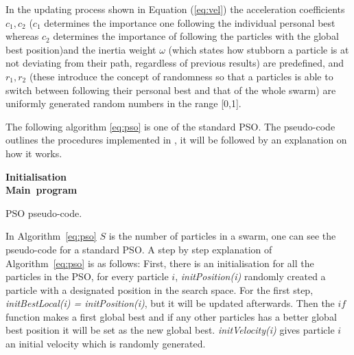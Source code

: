 \documentclass{pdfmx4020}
\begin{document}
  In the updating process shown in Equation (\ref{eq:vel}) the acceleration coefficients $c_1, c_2$ ($c_1$ determines the importance one following the individual personal best whereas $c_2$ determines the importance of following the particles with the global best position)and the inertia weight $\omega$ (which states how stubborn a particle is at not deviating from their path, regardless of previous results) are predefined, and $r_1, r_2$ (these introduce the concept of randomness so that a particles is able to switch between following their personal best and that of the whole swarm) are uniformly generated random numbers in the range [0,1].

  The following algorithm \ref{eq:pso} is one of the standard PSO. The pseudo-code outlines the procedures implemented in \cite{haskellPSO}, it will be followed by an explanation on how it works.   
    \begin{algorithm}[H] \label{eq:pso}
      \mbox{\textbf{Initialisation}} \\
      \mbox{\textbf{Main program}} \\      
      \caption{PSO pseudo-code.}
    \end{algorithm}
  
  In Algorithm~\ref{eq:pso} $S$ is the number of particles in a swarm, one can see the pseudo-code for a standard PSO. A step by step explanation of Algorithm~\ref{eq:pso} is as follows: First, there is an initialisation for all the particles in the PSO, for every particle $i$, \textit{initPosition(i)} randomly created a particle with a designated position in the search space. For the first step, \textit{initBestLocal(i) = initPosition(i)}, but it will be updated afterwards. Then the $if$ function makes a first global best and if any other particles has a better global best position it will be set as the new global best. \textit{initVelocity(i)} gives particle $i$ an initial velocity which is randomly generated. 
\end{document}
